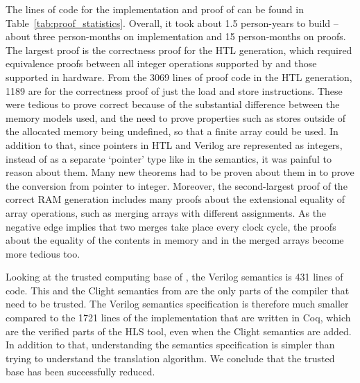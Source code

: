 The lines of code for the implementation and proof of \vericert{} can be found in Table~\ref{tab:proof_statistics}.  Overall, it took about 1.5 person-years to build \vericert{} -- about three person-months on implementation and 15 person-months on proofs.  The largest proof is the correctness proof for the HTL generation, which required equivalence proofs between all integer operations supported by \compcert{} and those supported in hardware.  From the 3069 lines of proof code in the HTL generation, 1189 are for the correctness proof of just the load and store instructions.  These were tedious to prove correct because of the substantial difference between the memory models used, and the need to prove properties such as stores outside of the allocated memory being undefined, so that a finite array could be used. In addition to that, since pointers in HTL and Verilog are represented as integers, instead of as a separate `pointer' type like in the \compcert{} semantics, it was painful to reason about them.  Many new theorems had to be proven about them in \vericert{} to prove the conversion from pointer to integer.  Moreover, the second-largest proof of the correct RAM generation includes many proofs about the extensional equality of array operations, such as merging arrays with different assignments.  As the negative edge implies that two merges take place every clock cycle, the proofs about the equality of the contents in memory and in the merged arrays become more tedious too.

Looking at the trusted computing base of \vericert{}, the Verilog semantics is 431 lines of code.  This and the Clight semantics from \compcert{} are the only parts of the compiler that need to be trusted.  The Verilog semantics specification is therefore much smaller compared to the 1721 lines of the implementation that are written in Coq, which are the verified parts of the HLS tool, even when the Clight semantics are added.  In addition to that, understanding the semantics specification is simpler than trying to understand the translation algorithm. We conclude that the trusted base has been successfully reduced.

